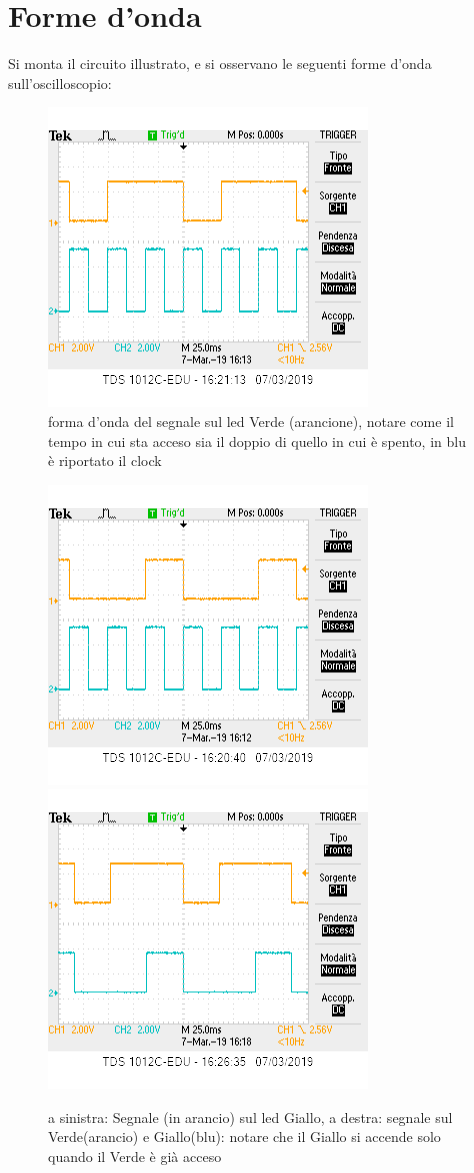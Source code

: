 \documentclass[10pt,a4paper]{article}
\begin{document}
\section{Forme d'onda}
Si monta il circuito illustrato, e si osservano le seguenti forme d'onda sull'oscilloscopio:
\begin{figure}\centering
	\includegraphics[scale=0.7]{green.png}
	\caption{forma d'onda del segnale sul led Verde (arancione), notare come il tempo in cui sta acceso sia il doppio di quello in cui è spento, in blu è riportato il clock}
	
\end{figure}
\begin{figure}
	\includegraphics[scale=0.7]{yellow.png}
	\includegraphics[scale=0.7]{yellowandgreen.png}
	\caption{a sinistra: Segnale (in arancio) sul led Giallo, a destra: segnale sul Verde(arancio) e Giallo(blu): notare che il Giallo si accende solo quando il Verde è già acceso }
	
\end{figure}
\end{document}
